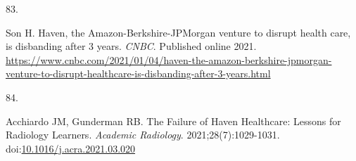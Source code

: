 \documentclass[
  american,
  11pt,
  letterpaper,
  oneside  ,captions=tableheading
]{scrartcl}
\newlength{\cslhangindent}
\newlength{\csllabelwidth}
\newenvironment{CSLReferences}[2] %
 {\begin{list}{}{%
  \setlength{\itemindent}{0pt}
  \setlength{\leftmargin}{0pt}
  \setlength{\parsep}{0pt}
  \ifodd #1
   \setlength{\leftmargin}{\cslhangindent}
   \setlength{\itemindent}{-1\cslhangindent}
  \fi
  \setlength{\itemsep}{#2\baselineskip}}}
 {\end{list}}
\newcommand{\CSLLeftMargin}[1]{\parbox[t]{\csllabelwidth}{\strut#1\strut}}
\newcommand{\CSLRightInline}[1]{\parbox[t]{\linewidth - \csllabelwidth}{\strut#1\strut}}
\begin{document}
\begin{CSLReferences}{0}{1}
\CSLLeftMargin{83. }%
\CSLRightInline{Son H. {Haven, the Amazon-Berkshire-JPMorgan venture to
disrupt health care, is disbanding after 3 years}. \emph{{CNBC}}.
Published online 2021.
\url{https://www.cnbc.com/2021/01/04/haven-the-amazon-berkshire-jpmorgan-venture-to-disrupt-healthcare-is-disbanding-after-3-years.html}}

\CSLLeftMargin{84. }%
\CSLRightInline{Acchiardo JM, Gunderman RB. {The Failure of Haven
Healthcare: Lessons for Radiology Learners}. \emph{Academic Radiology}.
2021;28(7):1029-1031.
doi:\href{https://doi.org/10.1016/j.acra.2021.03.020}{10.1016/j.acra.2021.03.020}}

\end{CSLReferences}
\end{document}
